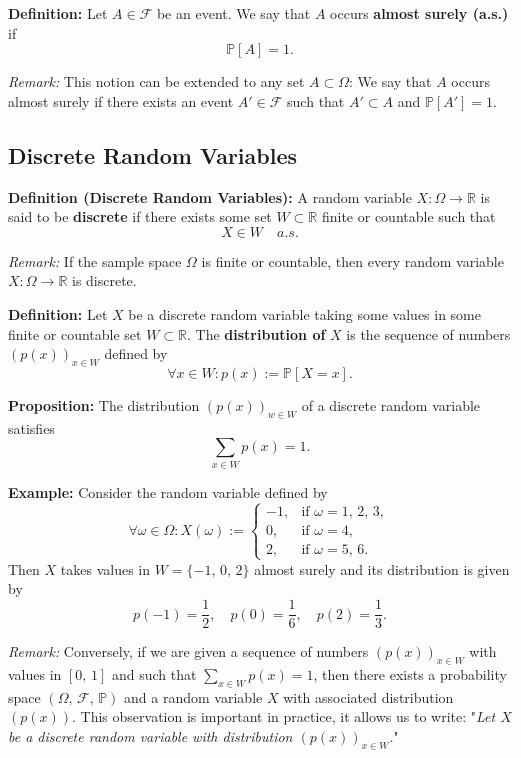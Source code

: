 \documentclass[a4paper]{extarticle}
\begin{document}
\textbf{Definition:} Let \(A \in \mathcal{F}\) be an event. We say that \(A\) occurs \textbf{almost surely (a.s.)} if
\[
    \mathbb{P}[A] = 1.
\]

\textit{Remark:} This notion can be extended to any set \(A \subset \Omega\): We say that \(A\) occurs almost surely if there exists an event \(A' \in \mathcal{F}\) such that \(A' \subset A\) and \(\mathbb{P}[A'] = 1\).

\subsection{Discrete Random Variables}

\textbf{Definition (Discrete Random Variables):} A random variable \(X : \Omega \to \mathbb{R}\) is said to be \textbf{discrete} if there exists some set \(W \subset \mathbb{R}\) finite or countable such that
\[
    X \in W \quad a.s.
\]

\textit{Remark:} If the sample space \(\Omega\) is finite or countable, then every random variable \(X : \Omega \to \mathbb{R}\) is discrete.

\textbf{Definition:} Let \(X\) be a discrete random variable taking some values in some finite or countable set \(W \subset \mathbb{R}\). The \textbf{distribution of} \(X\) is the sequence of numbers \((p(x))_{x \in W}\) defined by
\[
    \forall x \in W : p(x) := \mathbb{P}[X = x].
\]

\begin{cbox}
    \textbf{Proposition:} The distribution \((p(x))_{w \in W}\) of a discrete random variable satisfies
    \[
        \sum_{x \in W} p(x) = 1.
    \]
\end{cbox}

\begin{ebox}
    \textbf{Example:} Consider the random variable defined by
    \[
        \forall \omega \in \Omega : X(\omega) := \begin{cases}
            -1, &\text{if } \omega = 1, \, 2, \, 3,\\
            0, &\text{if } \omega = 4,\\
            2, &\text{if } \omega = 5, \, 6.
        \end{cases}
    \]
    Then \(X\) takes values in \(W = \{-1, \, 0, \, 2\}\) almost surely and its distribution is given by
    \[
        p(-1) = \frac{1}{2}, \quad p(0) = \frac{1}{6}, \quad p(2) = \frac{1}{3}.
    \]
\end{ebox}

\textit{Remark:} Conversely, if we are given a sequence of numbers \((p(x))_{x \in W}\) with values in \([0, \, 1]\) and such that \(\sum_{x \in W} p(x) = 1\), then there exists a probability space \((\Omega, \, \mathcal{F}, \, \mathbb{P})\) and a random variable \(X\) with associated distribution \((p(x))\). This observation is important in practice, it allows us to write: "\textit{Let \(X\) be a discrete random variable with distribution \((p(x))_{x \in W}\).}"
\end{document}
